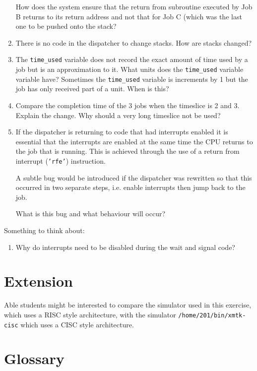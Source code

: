 \documentclass[a4paper,10pt]{article}
\begin{document}
\begin{enumerate}
How does the system ensure that the return from subroutine executed by
Job B returns to its return address and not that for Job C (which was
the last one to be pushed onto the stack?

\item
There is no code in the dispatcher to change stacks.  How are stacks
changed?


\item
The \texttt{time\_used} variable does not record the exact amount of
time used by a job but is an approximation to it.  What units does the
\texttt{time\_used} variable variable have?  Sometimes the
\texttt{time\_used} variable is increments by 1 but the job has only
received part of a unit.  When is this?


\item
Compare the completion time of the 3 jobs when the timeslice is 2 and
3. Explain the change.  Why should a very long timeslice not be used?

\item 
If the dispatcher is returning to code that had interrupts enabled it
is essential that the interrupts are enabled at the same time the CPU
returns to the job that is running.  This is achieved through the use
of a return from interrupt (\texttt{'rfe'}) instruction.

A subtle bug would be introduced if the dispatcher was rewritten so
that this occurred in two separate steps, i.e. enable interrupts then
jump back to the job.  

What is this bug and what behaviour will occur? 
\end{enumerate}

Something to think about:

\begin{enumerate}
\item
Why do interrupts need to be disabled during the wait and signal code?
\end{enumerate}


\section{Extension}

Able students might be interested to compare the simulator used in
this exercise, which uses a RISC style architecture, with the
simulator \verb+/home/201/bin/xmtk-cisc+ which uses a CISC style
architecture.

\section{Glossary}
\end{document}
